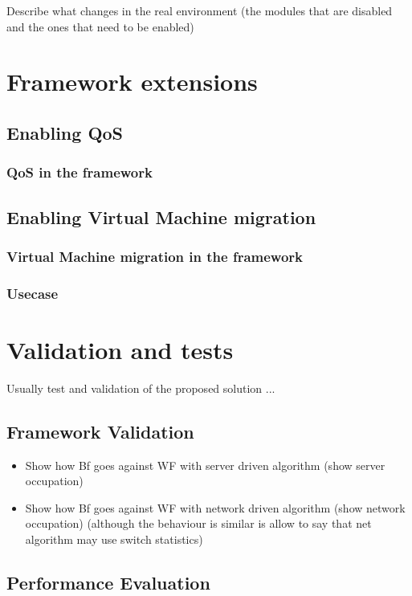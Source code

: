 \documentclass[12pt,english]{book}
\begin{document}
Describe what changes in the real environment (the modules that are disabled and the ones that need to be enabled)

\chapter{Framework extensions \label{cha:} }

\section{Enabling QoS}
\subsection{QoS in the framework}
\newpage

\section{Enabling Virtual Machine migration}
\subsection{Virtual Machine migration in the framework}
\subsection{Usecase}

\chapter{Validation and tests \label{cha:valtes} }

Usually test and validation of the proposed solution ...

\section{Framework Validation}

\begin{itemize}
	\item Show how Bf goes against WF with server driven algorithm (show server occupation)
	\item Show how Bf goes against WF with network driven algorithm (show network occupation) (although the behaviour is similar is allow to say that net algorithm may use switch statistics)
\end{itemize}
\newpage


\section{Performance Evaluation}
\end{document}
